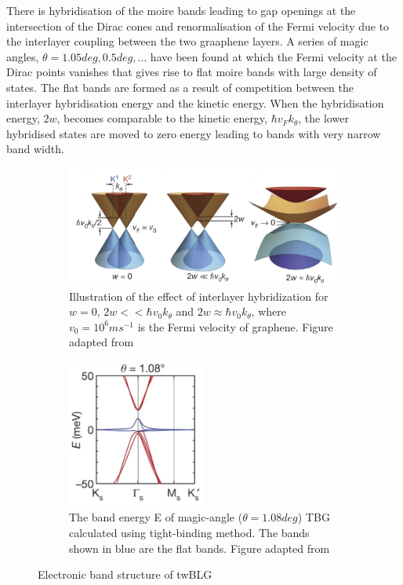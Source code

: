 There is hybridisation of the moire bands leading to gap openings at the intersection of the Dirac cones and renormalisation of the Fermi velocity due to the interlayer coupling between the two graaphene layers. A series of magic angles, $\theta=1.05 deg, 0.5 deg, ...$ have been found at which the Fermi velocity at the Dirac points vanishes that gives rise to flat moire bands with large density of states. The flat bands are formed as a result of competition between the interlayer hybridisation energy and the kinetic energy. When the hybridisation energy, $2w$, becomes comparable to the kinetic energy, $\hbar v_Fk_\theta$, the lower hybridised states are moved to zero energy leading to bands with very narrow band width.
\begin{figure}[H]
     \centering
     \begin{subfigure}[b]{0.8\textwidth}
         \centering
         \includegraphics[width=\textwidth]{figures/twblg_hyb.jpg}
         \caption{Illustration of the effect of interlayer hybridization for $w=0$, $2w<<\hbar v_0 k_\theta$ and $2w\approx \hbar v_0 k_\theta$, where $v_0=10^6ms^{-1}$ is the Fermi velocity of graphene. Figure adapted from \cite{Cao2018}}
     \end{subfigure}
     
     \begin{subfigure}[b]{0.8\textwidth}
         \centering
         \includegraphics[width=0.5\textwidth]{figures/flatband.jpg}
         \caption{The band energy E of magic-angle ($\theta=1.08deg$) TBG calculated using tight-binding method. The bands shown in blue are the flat bands. Figure adapted from \cite{Cao2018}}
     \end{subfigure}
\caption{Electronic band structure of twBLG}
\end{figure}

